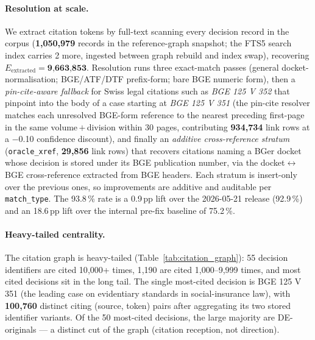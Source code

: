 \documentclass[11pt,a4paper]{article}
\begin{document}


\FloatBarrier

\paragraph{Resolution at scale.} We extract citation tokens by full-text scanning every decision record in the corpus (\textbf{1{,}050{,}979} records in the reference-graph snapshot; the FTS5 search index carries 2 more, ingested between graph rebuild and index swap), recovering $E_{\textrm{extracted}} = \textbf{9{,}663{,}853}$. Resolution runs three exact-match passes (general docket-normalisation; BGE/ATF/DTF prefix-form; bare BGE numeric form), then a \emph{pin-cite-aware fallback} for Swiss legal citations such as \emph{BGE 125 V 352} that pinpoint into the body of a case starting at \emph{BGE 125 V 351} (the pin-cite resolver matches each unresolved BGE-form reference to the nearest preceding first-page in the same volume\,$+$\,division within 30 pages, contributing \textbf{934{,}734} link rows at a $-$0.10 confidence discount), and finally an \emph{additive cross-reference stratum} (\texttt{oracle\_xref}, \textbf{29{,}856} link rows) that recovers citations naming a BGer docket whose decision is stored under its BGE publication number, via the docket$\leftrightarrow$BGE cross-reference extracted from BGE headers. Each stratum is insert-only over the previous ones, so improvements are additive and auditable per \texttt{match\_type}. The 93.8\,\% rate is a 0.9\,pp lift over the 2026-05-21 release (92.9\,\%) and an 18.6\,pp lift over the internal pre-fix baseline of 75.2\,\%.

\paragraph{Heavy-tailed centrality.} The citation graph is heavy-tailed (Table~\ref{tab:citation_graph}): 55 decision identifiers are cited 10{,}000+ times, 1{,}190 are cited 1{,}000--9{,}999 times, and most cited decisions sit in the long tail. The single most-cited decision is BGE 125 V 351 (the leading case on evidentiary standards in social-insurance law), with \textbf{100{,}760} distinct citing (source, token) pairs after aggregating its two stored identifier variants. Of the 50 most-cited decisions, the large majority are DE-originals --- a distinct cut of the graph (citation reception, not direction).
\end{document}
